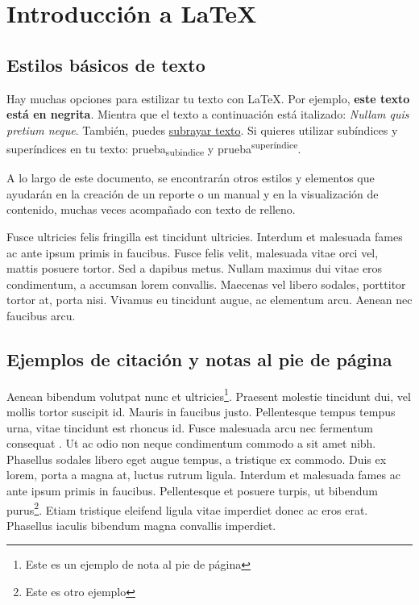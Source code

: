 \documentclass[12pt, a4paper]{article}
\begin{document}
\section{Introducción a LaTeX}

\subsection{Estilos básicos de texto}

Hay muchas opciones para estilizar tu texto con LaTeX. Por ejemplo, \textbf{este texto está en negrita}. Mientra que el texto a continuación está italizado: \textit{Nullam quis pretium neque}. También, puedes \underline{subrayar texto}. Si quieres utilizar subíndices y superíndices en tu texto: prueba\textsubscript{subindice} y prueba\textsuperscript{superíndice}.

A lo largo de este documento, se encontrarán otros estilos y elementos que ayudarán en la creación de un reporte o un manual y en la visualización de contenido, muchas veces acompañado con texto de relleno.

Fusce ultricies felis fringilla est tincidunt ultricies. Interdum et malesuada fames ac ante ipsum primis in faucibus. Fusce felis velit, malesuada vitae orci vel, mattis posuere tortor. Sed a dapibus metus. Nullam maximus dui vitae eros condimentum, a accumsan lorem convallis. Maecenas vel libero sodales, porttitor tortor at, porta nisi. Vivamus eu tincidunt augue, ac elementum arcu. Aenean nec faucibus arcu.

\subsection{Ejemplos de citación y notas al pie de página}

Aenean bibendum volutpat nunc et ultricies\footnote{Este es un ejemplo de nota al pie de página}. Praesent molestie tincidunt dui, vel mollis tortor suscipit id. Mauris in faucibus justo. Pellentesque tempus tempus urna, vitae tincidunt est rhoncus id. Fusce malesuada arcu nec fermentum consequat \cite{exampleBook}. Ut ac odio non neque condimentum commodo a sit amet nibh. Phasellus sodales libero eget augue tempus, a tristique ex commodo. Duis ex lorem, porta a magna at, luctus rutrum ligula. Interdum et malesuada fames ac ante ipsum primis in faucibus. Pellentesque et posuere turpis, ut bibendum purus\footnote{Este es otro ejemplo}. Etiam tristique eleifend ligula vitae imperdiet \cite{exampleBook} donec ac eros erat. Phasellus iaculis bibendum magna convallis imperdiet.
\end{document}
